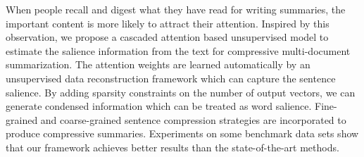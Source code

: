 When people recall and digest what they have read for writing summaries, the important content is more likely to attract their attention. Inspired by this observation, we propose a cascaded attention based unsupervised model to estimate the salience information from the text for compressive multi-document summarization. The attention weights are learned automatically by an unsupervised data reconstruction framework which can capture the sentence salience. By adding sparsity constraints on the number of output vectors, we can generate condensed information which can be treated as word salience. Fine-grained and coarse-grained sentence compression strategies are incorporated to produce compressive summaries. Experiments on some benchmark data sets show that our framework achieves better results than the state-of-the-art methods.
